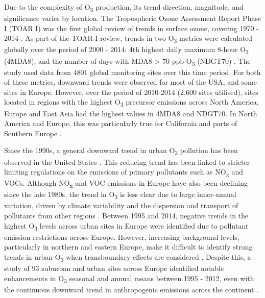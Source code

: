 \documentclass[journal abbreviation, manuscript]{copernicus}
\begin{document}
Due to the complexity of O\textsubscript{3} production, its trend direction, magnitude, and significance varies by location. The Tropospheric Ozone Assessment Report Phase I (TOAR I) was the first global review of trends in surface ozone, covering 1970 - 2014 \citep{fleming_2018, Gaudel2018}. As part of the TOAR-I review, trends in two O\textsubscript{3} metrics were calculated globally over the period of 2000 - 2014: 4th highest daily maximum 8-hour O\textsubscript{3} (4MDA8), and the number of days with MDA8 > 70 ppb O\textsubscript{3} (NDGT70) \citep{fleming_2018}. The study used data from 4801 global monitoring sites over this time period. For both of these metrics, downward trends were observed for most of the USA, and some sites in Europe. However, over the period of 2010-2014 (2,600 sites utilised), sites located in regions with the highest O\textsubscript{3} precursor emissions across North America, Europe and East Asia had the highest values in 4MDA8 and NDGT70. In North America and Europe, this was particularly true for California and parts of Southern Europe \citep{fleming_2018}.

Since the 1990s, a general downward trend in urban O\textsubscript{3} pollution has been observed in the United States \citep{acp-20-3191-2020}. This reducing trend has been linked to stricter limiting regulations on the emissions of primary pollutants such as NO\textsubscript{x} and VOCs. Although NO\textsubscript{x} and VOC emissions in Europe have also been declining since the late 1980s, the trend in O\textsubscript{3} is less clear due to large inner-annual variation, driven by climate variability and the dispersion and transport of pollutants from other regions \citep{acp-6-51-2006, acp-18-5589-2018}. Between 1995 and 2014, negative trends in the highest O\textsubscript{3} levels across urban sites in Europe were identified due to pollutant emission restrictions across Europe. However, increasing background levels, particularly in northern and eastern Europe, make it difficult to identify strong trends in urban O\textsubscript{3} when transboundary effects are considered \citep{acp-18-5589-2018}. Despite this, a study of 93 suburban and urban sites across Europe identified notable enhancements in O\textsubscript{3} seasonal and annual means between 1995 - 2012, even with the continuous downward trend in anthropogenic emissions across the continent \citep{acp-18-5589-2018}.
\end{document}
